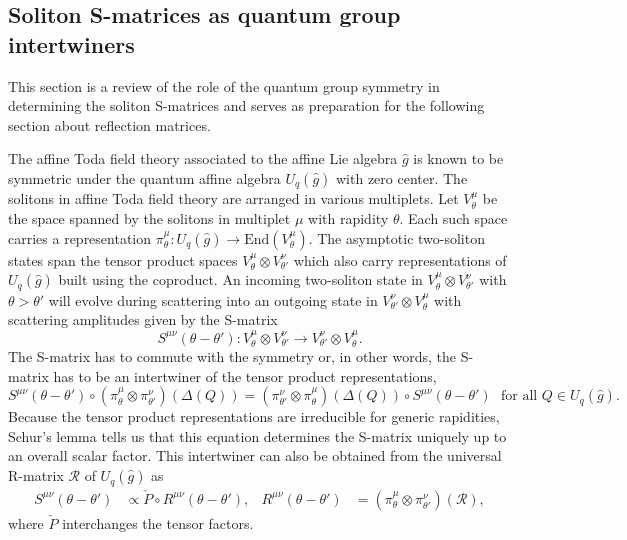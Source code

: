 \documentclass[a4paper,12pt]{article}
\newcommand{\End}{\text{End}}
\newcommand{\uqgh}{U_q(\hat{g})}
\numberwithin{equation}{section}
\begin{document}
\subsection{Soliton S-matrices as quantum group intertwiners\label{sectsqgi}}


This section is a review of the role of the quantum group symmetry
in determining the soliton S-matrices and serves as preparation
for the following section about reflection matrices.

The affine Toda field theory associated to the affine Lie algebra
$\hat{g}$ is known \cite{Ber91,Fel92} to be symmetric under the
quantum affine algebra $\uqgh$ with zero center. The solitons in
affine Toda field theory are arranged in various multiplets. Let
$V^\mu_\theta$ be the space spanned by the solitons in multiplet
$\mu$ with rapidity $\theta$. Each such space carries a
representation $\pi^\mu_\theta: \uqgh\rightarrow
\End(V^\mu_\theta)$. The asymptotic two-soliton states span the
tensor product spaces $V^\mu_\theta\otimes V^\nu_{\theta'}$ which
also carry representations of $\uqgh$ built using the coproduct.
An incoming two-soliton state in $V^\mu_\theta\otimes
V^\nu_{\theta'}$ with $\theta>\theta'$ will evolve during
scattering into an outgoing state in $V^\nu_{\theta'}\otimes
V^\mu_{\theta}$ with scattering amplitudes given by the S-matrix
\begin{equation}
  S^{\mu\nu}(\theta-\theta'):V^\mu_\theta\otimes
  V^\nu_{\theta'}\rightarrow V^\nu_{\theta'}\otimes
  V^\mu_{\theta}.
\end{equation}
The S-matrix has to commute with the symmetry or, in other words,
the S-matrix has to be an intertwiner of the tensor product
representations,
\begin{equation}\label{sint}
  S^{\mu\nu}(\theta-\theta')\circ
  (\pi^\mu_\theta\otimes\pi^\nu_{\theta'})
  (\Delta(Q))=
  (\pi^\nu_{\theta'}\otimes\pi^\mu_{\theta})
  (\Delta(Q))\circ
  S^{\mu\nu}(\theta-\theta')~~~\text{for all }Q\in\uqgh.
\end{equation}
Because the tensor product representations are irreducible for
generic rapidities, Schur's lemma tells us that this equation
determines the S-matrix uniquely up to an overall scalar factor.
This intertwiner can also be obtained from the universal R-matrix
${\mathcal R}$ of $\uqgh$ as
\begin{align}\label{sr}
  S^{\mu\nu}(\theta-\theta')&\propto\check{P}\circ
  R^{\mu\nu}(\theta-\theta'),&
  R^{\mu\nu}(\theta-\theta')&=
  (\pi^\mu_\theta\otimes\pi^\nu_{\theta'})({\mathcal
  R}),
\end{align}
where $\check{P}$ interchanges the tensor factors.
\end{document}
